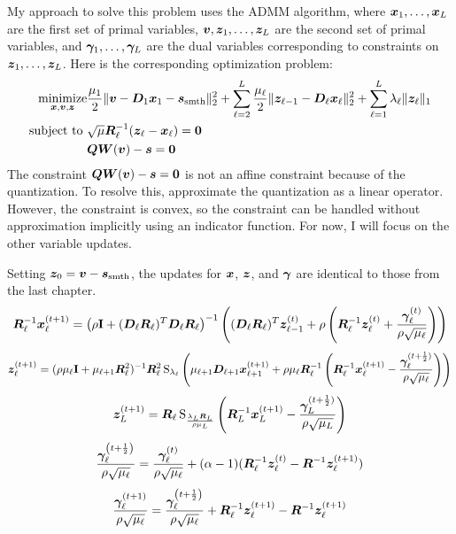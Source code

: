 My approach to solve this problem uses the ADMM algorithm, where $\bm{x}_1,\ldots,\bm{x}_L$ are the first set of primal variables, $\bm{v},\bm{z}_1,\ldots,\bm{z}_L$ are the second set of primal variables,  and $\bm{\gamma}_1,\ldots,\bm{\gamma}_L$ are the dual variables corresponding to constraints on $\bm{z}_1,\ldots,\bm{z}_L$.  Here is the corresponding optimization problem:
%
\begin{equation}
\begin{aligned}
\operatorname*{\text{minimize}}_{\bm{x},\bm{v},\bm{z}} & \frac{\mu_1}{2}\|\bm{v} - \bm{D}_1\bm{x}_1  - \bm{s}_{\text{smth}}\|_2^2 + \sum_{\ell = 2}^L \frac{\mu_{\ell}}{2}\|\bm{z}_{\ell - 1} - \bm{D}_{\ell}\bm{x}_{\ell}\|_2^2 + \sum_{\ell = 1}^L \lambda_{\ell}\|\bm{z}_{\ell}\|_1 \\
\text{subject to } & \sqrt{\mu}\bm{R}_{\ell}^{-1}(\bm{z}_{\ell} - \bm{x}_{\ell}) = \bm{0} \\
                   & \bm{Q}\bm{W}(\bm{v}) - \bm{s} = \bm{0}
\end{aligned}
\end{equation}
%
The constraint $\bm{Q}\bm{W}(\bm{v}) - \bm{s} = \bm{0}$ is not an affine constraint because of the quantization. To resolve this, \cite{chodosh2020use} approximate the quantization as a linear operator. However, the constraint is convex, so the constraint can be handled without approximation implicitly using an indicator function. For now, I will focus on the other variable updates.

Setting $\bm{z}_0 = \bm{v} - \bm{s}_{\text{smth}}$, the updates for $\bm{x}$, $\bm{z}$, and $\bm{\gamma}$ are identical to those from the last chapter.
%
\begin{equation}
\bm{R}_{\ell}^{-1}\bm{x}_{\ell}^{(t + 1)} = \left(\rho {\bf I} + (\bm{D}_{\ell}\bm{R}_{\ell})^T\bm{D}_{\ell}\bm{R}_{\ell}\right)^{-1}\left((\bm{D}_{\ell}\bm{R}_{\ell})^T\bm{z}_{\ell - 1}^{(t)} + \rho \left(\bm{R}_{\ell}^{-1}\bm{z}_{\ell}^{(t)} + \frac{\bm{\gamma}_{\ell}^{(t)}}{\rho\sqrt{\mu_{\ell}}}\right)\right)
\end{equation}
%
\begin{equation}
\bm{z}_{\ell}^{(t + 1)} = (\rho\mu_{\ell}{\bf I} + \mu_{\ell + 1}\bm{R}_{\ell}^2)^{-1}\bm{R}_{\ell}^2\operatorname{S}_{\lambda_{\ell}}\left(\mu_{\ell + 1}\bm{D}_{\ell + 1}\bm{x}_{\ell + 1}^{(t + 1)} + \rho\mu_{\ell}\bm{R}_{\ell}^{-1}\left(\bm{R}_{\ell}^{-1}\bm{x}_{\ell}^{(t + 1)} - \frac{\bm{\gamma}_{\ell}^{(t + \frac{1}{2})}}{\rho\sqrt{\mu_{\ell}}}\right)\right)
\end{equation}
%
\begin{equation}
\bm{z}_L^{(t + 1)} = \bm{R}_{\ell}\operatorname{S}_{\frac{\lambda_L\bm{R}_L}{\rho\mu_L}}\left(\bm{R}_L^{-1}\bm{x}_L^{(t + 1)} - \frac{\bm{\gamma}_L^{(t + \frac{1}{2})}}{\rho\sqrt{\mu_L}}\right)
\end{equation}
%
\begin{equation}
\frac{\bm{\gamma}_{\ell}^{\left(t + \frac{1}{2}\right)}}{\rho\sqrt{\mu_{\ell}}} = \frac{\bm{\gamma}_{\ell}^{(t)}}{\rho\sqrt{\mu_{\ell}}} + (\alpha - 1)(\bm{R}_{\ell}^{-1}\bm{z}_{\ell}^{(t)} - \bm{R}^{-1}\bm{z}_{\ell}^{(t + 1)})
\end{equation}
%
\begin{equation}
\frac{\bm{\gamma}_{\ell}^{(t + 1)}}{\rho\sqrt{\mu_{\ell}}} = \frac{\bm{\gamma}_{\ell}^{\left(t + \frac{1}{2}\right)}}{\rho\sqrt{\mu_{\ell}}} + \bm{R}_{\ell}^{-1}\bm{z}_{\ell}^{(t + 1)} - \bm{R}^{-1}\bm{z}_{\ell}^{(t + 1)} 
\end{equation}
%

